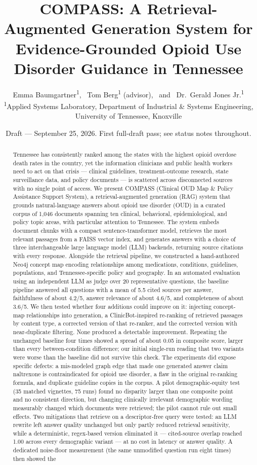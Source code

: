 \documentclass[11pt]{article}
\title{\textbf{COMPASS: A Retrieval-Augmented Generation System for\\
Evidence-Grounded Opioid Use Disorder Guidance in Tennessee}}
\author{
  Emma Baumgartner\textsuperscript{1}, \ Tom Berg\textsuperscript{1} (advisor), \ and \ Dr.\ Gerald Jones Jr.\textsuperscript{1}\\[6pt]
  \small \textsuperscript{1}Applied Systems Laboratory, Department of Industrial \& Systems Engineering, University of Tennessee, Knoxville
}
\date{\small Draft --- September 25, 2026. First full-draft pass; see status notes throughout.}
\begin{document}
\maketitle

\begin{abstract}
\noindent
Tennessee has consistently ranked among the states with the highest opioid overdose death rates in the country, yet the information clinicians and public health workers need to act on that crisis --- clinical guidelines, treatment-outcome research, state surveillance data, and policy documents --- is scattered across disconnected sources with no single point of access. We present COMPASS (Clinical OUD Map \& Policy Assistance Support System), a retrieval-augmented generation (RAG) system that grounds natural-language answers about opioid use disorder (OUD) in a curated corpus of 1{,}046 documents spanning ten clinical, behavioral, epidemiological, and policy topic areas, with particular attention to Tennessee. The system embeds document chunks with a compact sentence-transformer model, retrieves the most relevant passages from a FAISS vector index, and generates answers with a choice of three interchangeable large language model (LLM) backends, returning source citations with every response. Alongside the retrieval pipeline, we constructed a hand-authored Neo4j concept map encoding relationships among medications, conditions, guidelines, populations, and Tennessee-specific policy and geography. In an automated evaluation using an independent LLM as judge over 20 representative questions, the baseline pipeline answered all questions with a mean of 5.5 cited sources per answer, faithfulness of about 4.2/5, answer relevance of about 4.6/5, and completeness of about 3.6/5. We then tested whether four additions could improve on it: injecting concept-map relationships into generation, a ClinicBot-inspired re-ranking of retrieved passages by content type, a corrected version of that re-ranker, and the corrected version with near-duplicate filtering. None produced a detectable improvement. Repeating the unchanged baseline four times showed a spread of about 0.05 in composite score, larger than every between-condition difference; our initial single-run reading that two variants were worse than the baseline did not survive this check. The experiments did expose specific defects: a mis-modeled graph edge that made one generated answer claim naltrexone is contraindicated for opioid use disorder, a flaw in the original re-ranking formula, and duplicate guideline copies in the corpus. A pilot demographic-equity test (35 matched vignettes, 75 runs) found no disparity larger than one composite point and no consistent direction, but changing clinically irrelevant demographic wording measurably changed which documents were retrieved; the pilot cannot rule out small effects. Two mitigations that retrieve on a descriptor-free query were tested: an LLM rewrite left answer quality unchanged but only partly reduced retrieval sensitivity, while a deterministic, regex-based version eliminated it --- cited-source overlap reached 1.00 across every demographic variant --- at no cost in latency or answer quality. A dedicated noise-floor measurement (the same unmodified question run eight times) then showed the 
\end{abstract}
\end{document}

